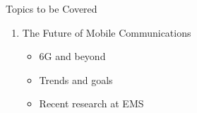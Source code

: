 \begin{frame}[allowframebreaks]{Topics to be Covered}
\begin{enumerate}
      \begin{itemize}
        \item How to commercialize a standard?
      \end{itemize}
    \item The Future of Mobile Communications
      \begin{itemize}
        \item 6G and beyond
        \item Trends and goals
        \item Recent research at EMS
      \end{itemize}
  \end{enumerate}
\end{frame}